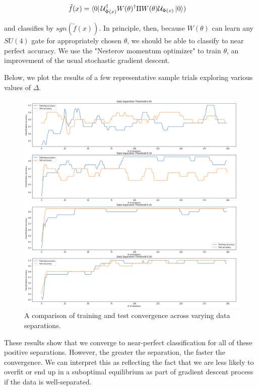 \documentclass[main.tex]{subfiles}
\begin{document}
\begin{align*}
\tilde{f}(x) &= \bra{0} \mathcal{U}_{\Phi(x)}^\dag W(\theta)^\dag \Pi W(\theta) \mathcal{U}_{\Phi(x)}\ket{0})
\end{align*}
 
and classifies by $sgn(\tilde{f}(x))$. In principle, then, because $W(\theta)$ can learn any $SU(4)$ gate for appropriately chosen $\theta$, we should be able to classify to near perfect accuracy. We use the "Nesterov momentum optimizer" to train $\theta$, an improvement of the usual stochastic gradient descent.

Below, we plot the results of a few representative sample trials exploring various values of $\Delta$.

\begin{figure}[H]
\includegraphics[width=\textwidth]{images/data_sep}
\caption{A comparison of training and test convergence across varying data separations.}
\end{figure}

These results show that we converge to near-perfect classification for all of these positive separations. However, the greater the separation, the faster the convergence. We can interpret this as reflecting the fact that we are less likely to overfit or end up in a suboptimal equilibrium as part of gradient descent process if the data is well-separated.
\end{document}
